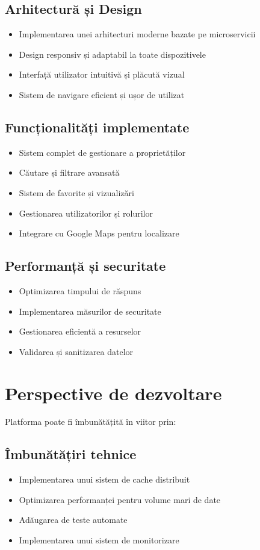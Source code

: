 \documentclass[12pt,a4paper]{report}
\begin{document}
\subsection{Arhitectură și Design}
\begin{itemize}
    \item Implementarea unei arhitecturi moderne bazate pe microservicii
    \item Design responsiv și adaptabil la toate dispozitivele
    \item Interfață utilizator intuitivă și plăcută vizual
    \item Sistem de navigare eficient și ușor de utilizat
\end{itemize}

\subsection{Funcționalități implementate}
\begin{itemize}
    \item Sistem complet de gestionare a proprietăților
    \item Căutare și filtrare avansată
    \item Sistem de favorite și vizualizări
    \item Gestionarea utilizatorilor și rolurilor
    \item Integrare cu Google Maps pentru localizare
\end{itemize}

\subsection{Performanță și securitate}
\begin{itemize}
    \item Optimizarea timpului de răspuns
    \item Implementarea măsurilor de securitate
    \item Gestionarea eficientă a resurselor
    \item Validarea și sanitizarea datelor
\end{itemize}

\section{Perspective de dezvoltare}
Platforma poate fi îmbunătățită în viitor prin:

\subsection{Îmbunătățiri tehnice}
\begin{itemize}
    \item Implementarea unui sistem de cache distribuit
    \item Optimizarea performanței pentru volume mari de date
    \item Adăugarea de teste automate
    \item Implementarea unui sistem de monitorizare
\end{itemize}
\end{document}
